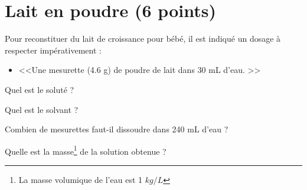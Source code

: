 \section{Lait en poudre (6 points)}

Pour reconstituer du lait de croissance pour bébé, il est indiqué un dosage à respecter impérativement :
\begin{itemize}
	\item <<Une mesurette (\num{4.6} g) de poudre de lait dans 30 mL d'eau. >>	
\end{itemize}

\begin{questions}
	\question[1] Quel est le soluté ?
	
	\question[1] Quel est le solvant ?
	
	\question[2] Combien de mesurettes faut-il dissoudre dans 240 mL d'eau ?
	
	\question[2] Quelle est la masse\footnote{La masse volumique de l'eau est 1 $kg/L$} de la solution obtenue ? 
\end{questions}